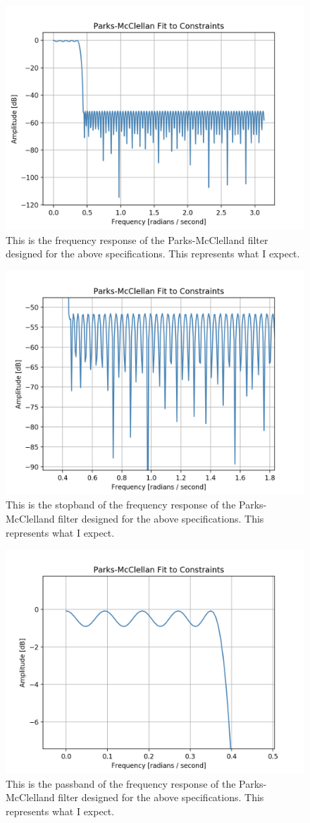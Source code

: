 \documentclass{article}
\begin{document}
\begin{figure}[h] \label{fig:parks_2}
    \centering
    \includegraphics[width=.5\textwidth]{parks_2.png}
    \caption{This is the frequency response of the Parks-McClelland filter designed for the above specifications. This represents what I expect.}
\end{figure}

\begin{figure}[h] \label{fig:parks_2}
    \centering
    \includegraphics[width=.5\textwidth]{parks_2_3.png}
    \caption{This is the stopband of the frequency response of the Parks-McClelland filter designed for the above specifications. This represents what I expect.}
\end{figure}

\begin{figure}[h] \label{fig:parks_2}
    \centering
    \includegraphics[width=.5\textwidth]{parks_2_1.png}
    \caption{This is the passband of the frequency response of the Parks-McClelland filter designed for the above specifications. This represents what I expect.}
\end{figure}
\end{document}

